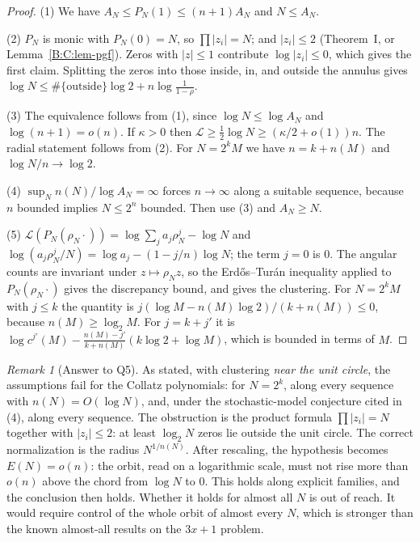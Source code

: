 \documentclass[11pt,a4paper]{article}
\theoremstyle{definition}
\theoremstyle{remark}
\newtheorem{remark}[theorem]{Remark}
\numberwithin{equation}{section}
\begin{document}
\begin{proof}
(1) We have $A_N\le P_N(1)\le(n+1)A_N$ and $N\le A_N$.

(2) $P_N$ is monic with $P_N(0)=N$, so $\prod|z_i|=N$; and $|z_i|\le2$
(Theorem~I, or Lemma~\ref{B:C:lem-pgf}).  Zeros with $|z|\le1$ contribute
$\log|z_i|\le0$, which gives the first claim.  Splitting the zeros into those
inside, in, and outside the annulus gives
$\log N\le\#\{\text{outside}\}\log2+n\log\frac1{1-\rho}$.

(3) The equivalence follows from (1), since $\log N\le\log A_N$ and
$\log(n+1)=o(n)$.  If $\kappa>0$ then $\mathcal L\ge\frac12\log N\ge(\kappa/2+o(1))n$.
The radial statement follows from (2).  For $N=2^kM$ we have $n=k+n(M)$ and
$\log N/n\to\log2$.

(4) $\sup_Nn(N)/\log A_N=\infty$ forces $n\to\infty$ along a suitable sequence,
because $n$ bounded implies $N\le2^n$ bounded.  Then use (3) and $A_N\ge N$.

(5) $\mathcal L(P_N(\rho_N\cdot))=\log\sum_ja_j\rho_N^j-\log N$ and
$\log(a_j\rho_N^j/N)=\log a_j-(1-j/n)\log N$; the term $j=0$ is $0$.  The angular
counts are invariant under $z\mapsto\rho_Nz$, so the Erd\H{o}s--Tur\'an
inequality applied to $P_N(\rho_N\cdot)$ gives the discrepancy bound, and
\cite[Thm.~1]{R026} gives the clustering.  For $N=2^kM$ with $j\le k$ the
quantity is $j(\log M-n(M)\log2)/(k+n(M))\le0$, because $n(M)\ge\log_2M$.  For
$j=k+j'$ it is $\log c^{j'}(M)-\frac{n(M)-j'}{k+n(M)}(k\log2+\log M)$, which is
bounded in terms of $M$.
\end{proof}

\begin{remark}[Answer to Q5]\label{B:C:rem-Q5}
As stated, with clustering \emph{near the unit circle}, the assumptions fail for
the Collatz polynomials: for $N=2^k$, along every sequence with
$n(N)=O(\log N)$, and, under the stochastic-model conjecture cited in (4), along
every sequence.  The obstruction is the product formula $\prod|z_i|=N$
together with $|z_i|\le2$: at least $\log_2N$ zeros lie outside the unit circle.
The correct normalization is the radius $N^{1/n(N)}$.  After rescaling, the
hypothesis becomes $E(N)=o(n)$: the orbit, read on a logarithmic scale, must not
rise more than $o(n)$ above the chord from $\log N$ to $0$.  This holds along
explicit families, and the conclusion then holds.  Whether it holds for almost
all $N$ is out of reach.  It would require control of the whole orbit of almost
every $N$, which is stronger than the known almost-all results on the
$3x+1$ problem.
\end{remark}
\end{document}
